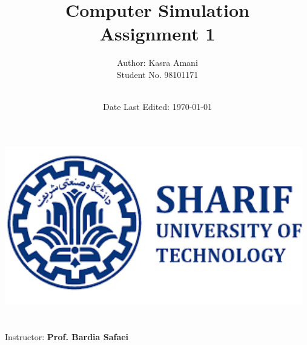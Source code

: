 \title{\Large Computer Simulation  \\[0.5cm]
        \bf\Large Assignment 1}
\author{\large Author: Kasra Amani\\ \normalsize Student No. 98101171 \\ \ \\}
\date{\large Date Last Edited: \today}

\makeatletter
    \begin{titlepage}
        \begin{center}
	   { \includegraphics[width=13cm]{sharif.png}}
	   {\ \\ \ \\}
        \vbox{}\vspace{5cm}
            {\@title }\\[3cm] 
            {\@author}
            {\large Instructor: \bf Prof. Bardia Safaei\\ \ \\}
            {\@date\\}

        \end{center}
    \end{titlepage}
\makeatother